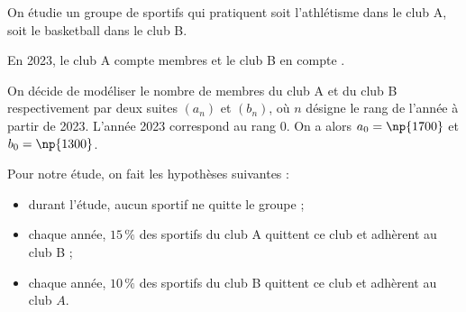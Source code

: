 \medskip

On étudie un groupe de  sportifs qui pratiquent soit l'athlétisme dans le club A, soit le basketball dans le club B.

En 2023, le club A compte  membres et le club B en compte .



On décide de modéliser le nombre de membres du club A et du club B respectivement par deux suites $\left(a_{n}\right)$ et $\left(b_{n}\right)$, où $n$ désigne le rang de l'année à partir de 2023.
L'année 2023 correspond au rang 0. On a alors $a_{0}= \np{1700}$ et $b_{0} = \np{1300}$.

Pour notre étude, on fait les hypothèses suivantes :
\begin{itemize}
\item durant l'étude, aucun sportif ne quitte le groupe ;
\item chaque année, $15\,\%$ des sportifs du club A quittent ce club et adhèrent au club B ;
\item chaque année, $10\,\%$ des sportifs du club B quittent ce club et adhèrent au club $A$.
\end{itemize}




